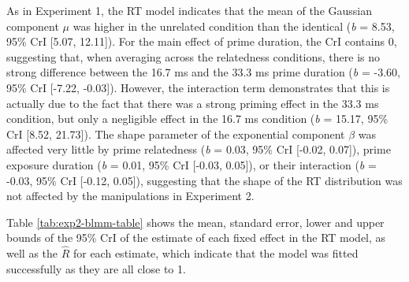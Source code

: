 \documentclass[
  english,
  man,floatsintext]{apa6}
\begin{document}
As in Experiment 1, the RT model indicates that the mean of the Gaussian component \(\mu\) was higher in the unrelated condition than the identical (\emph{b} = 8.53, 95\% CrI {[}5.07, 12.11{]}). For the main effect of prime duration, the CrI contains 0, suggesting that, when averaging across the relatedness conditions, there is no strong difference between the 16.7 ms and the 33.3 ms prime duration (\emph{b} = -3.60, 95\% CrI {[}-7.22, -0.03{]}). However, the interaction term demonstrates that this is actually due to the fact that there was a strong priming effect in the 33.3 ms condition, but only a negligible effect in the 16.7 ms condition (\emph{b} = 15.17, 95\% CrI {[}8.52, 21.73{]}). The shape parameter of the exponential component \(\beta\) was affected very little by prime relatedness (\emph{b} = 0.03, 95\% CrI {[}-0.02, 0.07{]}), prime exposure duration (\emph{b} = 0.01, 95\% CrI {[}-0.03, 0.05{]}), or their interaction (\emph{b} = -0.03, 95\% CrI {[}-0.12, 0.05{]}), suggesting that the shape of the RT distribution was not affected by the manipulations in Experiment 2.

Table \ref{tab:exp2-blmm-table} shows the mean, standard error, lower and upper bounds of the 95\% CrI of the estimate of each fixed effect in the RT model, as well as the \(\hat{R}\) for each estimate, which indicate that the model was fitted successfully as they are all close to 1.

\newpage
\end{document}
